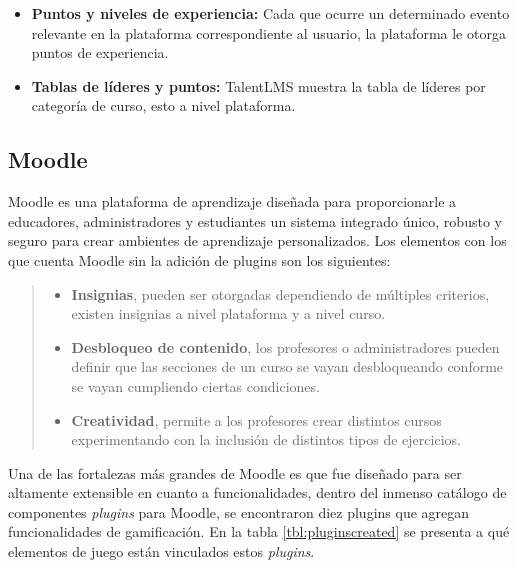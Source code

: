 \begin{multicols*}{2}
\begin{itemize}
        \item {\bf Puntos y niveles de experiencia:} Cada que ocurre un
            determinado evento relevante en la plataforma correspondiente al
            usuario, la plataforma le otorga puntos de experiencia.

        \item {\bf Tablas de líderes y puntos:} TalentLMS muestra la
            tabla de líderes por categoría de curso, esto a nivel plataforma.

    \end{itemize}

\end{multicols*}



\clearpage
\subsection*{Moodle}

 Moodle \cite{PagMoodle} es una plataforma de aprendizaje diseñada para proporcionarle
 a educadores, administradores y estudiantes un sistema integrado único, robusto y seguro
 para crear ambientes de aprendizaje personalizados. Los elementos con los que cuenta
 Moodle sin la adición de plugins son los siguientes:

 \begin{quote}
 \begin{itemize}
    \item {\bf Insignias}, pueden ser otorgadas dependiendo de múltiples criterios,
                existen insignias a nivel plataforma y a nivel curso.

    \item {\bf Desbloqueo de contenido}, los profesores o administradores pueden
                definir que las secciones de un curso se vayan desbloqueando
                conforme se vayan cumpliendo ciertas condiciones.

    \item {\bf Creatividad}, permite a los profesores crear distintos cursos
                experimentando con la inclusión de distintos tipos de ejercicios.
 \end{itemize}
 \end{quote}

 \noindent Una de las fortalezas más grandes de Moodle es que fue diseñado para ser altamente
 extensible en cuanto a funcionalidades, dentro del inmenso catálogo de componentes {\it plugins}
 para Moodle, se encontraron diez plugins que agregan funcionalidades de gamificación. En la tabla
 \ref{tbl:pluginscreated} se presenta a qué elementos de juego están vinculados estos {\it plugins}.


